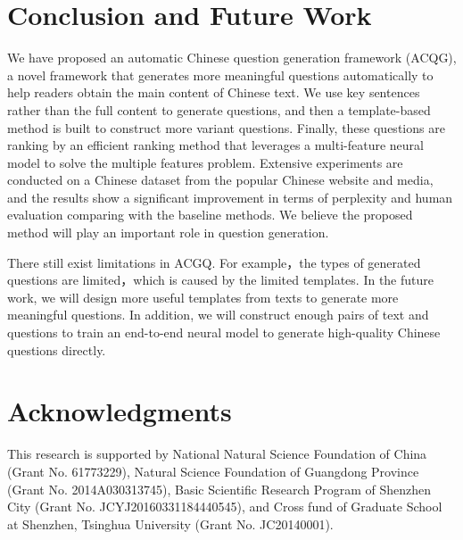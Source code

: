 \documentclass[runningheads,UTF8,article]{comsis2}
\newcommand\revised[1]{{\color{red} #1}}
\begin{document}
	\section{Conclusion and Future Work}
	We have proposed an automatic Chinese question generation framework (ACQG), a novel framework that generates more meaningful questions automatically to help readers obtain the main content of Chinese text. We use key sentences rather than the full content to generate questions, and then a template-based method is built to construct more variant questions. Finally, these questions are ranking by an efficient ranking method that leverages a multi-feature neural model to solve the multiple features problem. Extensive experiments are conducted on a Chinese dataset from the popular Chinese website and media, and the results show a significant improvement in terms of perplexity and human evaluation comparing with the baseline methods. We believe the proposed method will play an important role in question generation. 
	
	\revised{
		There  still exist limitations in ACGQ. For example，the types of generated questions are limited，which is caused by the limited templates.
		In the future work, we will design more useful templates from texts to generate more meaningful questions. In addition, we will construct enough pairs of text and questions to train an end-to-end neural model to generate high-quality Chinese questions directly.}
	
	
	\section{Acknowledgments}
	
	
	This research is supported by National Natural Science Foundation of China (Grant No. 61773229), Natural Science Foundation of Guangdong Province (Grant No. 2014A030313745), Basic Scientific Research Program of Shenzhen City (Grant No. JCYJ20160331184440545), and Cross fund of Graduate School at Shenzhen, Tsinghua University (Grant No. JC20140001).
	
	
	
	
	


	
	
\end{document}
